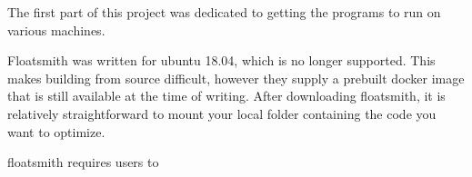 The first part of this project was dedicated to getting the programs to run on various machines.

Floatsmith was written for ubuntu 18.04, which is no longer supported. This makes building from source difficult, however they supply a prebuilt docker image that is still available at the time of writing.
After downloading floatsmith, it is relatively straightforward to mount your local folder containing the code you want to optimize.

floatsmith requires users to

